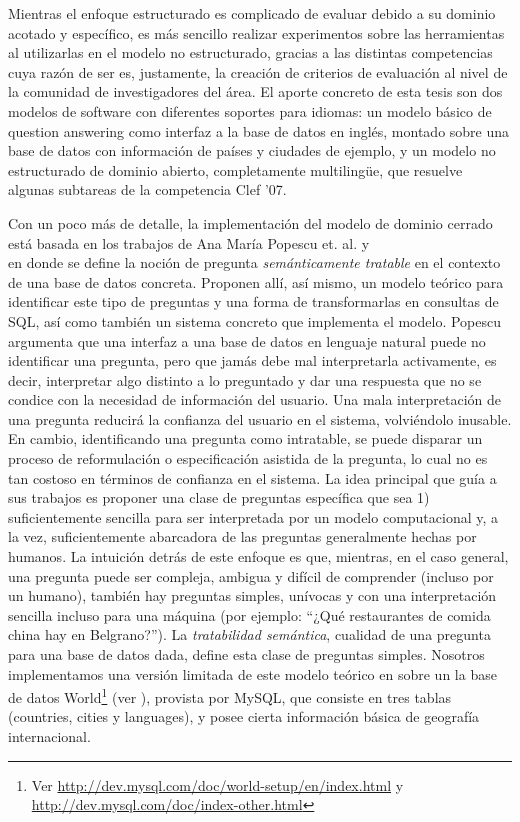 Mientras el enfoque estructurado es complicado de evaluar debido a su dominio acotado y específico, es más sencillo realizar experimentos sobre las herramientas al utilizarlas en el modelo no estructurado, gracias a las distintas competencias cuya razón de ser es, justamente, la creación de criterios de evaluación al nivel de la comunidad de investigadores del área. El aporte concreto de esta tesis son dos modelos de software con diferentes soportes para idiomas: un modelo básico de question answering como interfaz a la base de datos en inglés, montado sobre una base de datos con información de países y ciudades de ejemplo, y un modelo no estructurado de dominio abierto, completamente multilingüe, que resuelve algunas subtareas de la competencia Clef '07.


Con un poco más de detalle, la implementación del modelo de dominio cerrado está basada en los trabajos de Ana María Popescu et. al.  \cite{QADB1} y \\
\cite{QADB2} en donde se define la noción de pregunta \textit{semánticamente tratable} en el contexto de una base de datos concreta. Proponen allí, así mismo, un modelo teórico para identificar este tipo de preguntas y una forma de transformarlas en consultas de SQL, así como también un sistema concreto que implementa el modelo. Popescu argumenta que una interfaz a una base de datos en lenguaje natural puede no identificar una pregunta, pero que jamás debe mal interpretarla activamente, es decir, interpretar algo distinto a lo preguntado y dar una respuesta que no se condice con la necesidad de información del usuario. Una mala interpretación de una pregunta reducirá la confianza del usuario en el sistema, volviéndolo inusable. En cambio, identificando una pregunta como intratable, se puede disparar un proceso de reformulación o especificación asistida de la pregunta, lo cual no es tan costoso en términos de confianza en el sistema. La idea principal que guía a sus trabajos es proponer una clase de preguntas específica que sea 1) suficientemente sencilla para ser interpretada por un modelo computacional y, a la vez, suficientemente abarcadora de las preguntas generalmente hechas por humanos. La intuición detrás de este enfoque es que, mientras, en el caso general, una pregunta puede ser compleja, ambigua y difícil de comprender (incluso por un humano), también hay preguntas simples, unívocas y con una interpretación sencilla incluso para una máquina (por ejemplo: ``¿Qué restaurantes de comida china hay en Belgrano?''). La \textit{tratabilidad semántica}, cualidad de una pregunta para una base de datos dada, define esta clase de preguntas simples. Nosotros implementamos una versión limitada de este modelo teórico en  sobre un la base de datos World\footnote{Ver \url{http://dev.mysql.com/doc/world-setup/en/index.html} y \url{http://dev.mysql.com/doc/index-other.html}} (ver ), provista por MySQL, que consiste en tres tablas (countries, cities y languages), y posee cierta información básica de geografía internacional.

